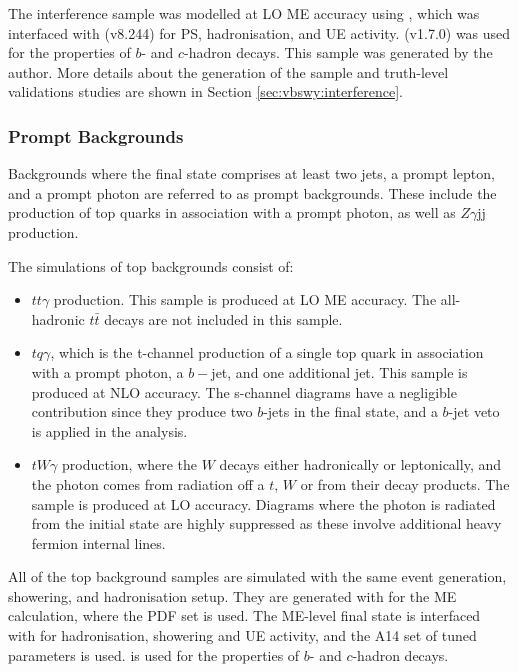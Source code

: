 The interference sample was modelled at LO ME accuracy using , which was interfaced with \PYTHIA (v8.244) for PS, hadronisation, and UE activity. \EVTGEN (v1.7.0) was used for the properties of $b$- and $c$-hadron decays. This sample was generated by the author. More details about the generation of the sample and truth-level validations studies are shown in Section \ref{sec:vbswy:interference}.

\subsubsection{Prompt Backgrounds}
Backgrounds where the final state comprises at least two jets, a prompt lepton, and a prompt photon are referred to as prompt backgrounds. These include the production of top quarks in association with a prompt photon, as well as $Z\gamma$jj production.

The simulations of top backgrounds consist of:
\begin{itemize}
  \item $tt\gamma$ production. This sample is produced at LO ME accuracy. The all-hadronic $t\bar{t}$ decays are not included in this sample.
  \item $tq\gamma$, which is the t-channel production of a single top quark in association with a prompt photon, a $b-$jet, and one additional jet. This sample is produced at NLO accuracy. The s-channel diagrams have a negligible contribution since they produce two $b$-jets in the final state, and a $b$-jet veto is applied in the analysis. 
  \item $tW\gamma$ production, where the $W$ decays either hadronically or leptonically, and the photon comes from radiation off a $t$, $W$ or from their decay products. The sample is produced at LO accuracy. Diagrams where the photon is radiated from the initial state are highly suppressed as these involve additional heavy fermion internal lines.
\end{itemize}

All of the top background samples are simulated with the same event generation, showering, and hadronisation setup. They are generated with \MGNLO for the ME calculation, where the \NNPDFtwolo PDF set is used. The ME-level final state is interfaced with \PYTHIA for hadronisation, showering and UE activity, and the A14 set of tuned parameters is used. \EVTGEN is used for the properties of $b$- and $c$-hadron decays. 


